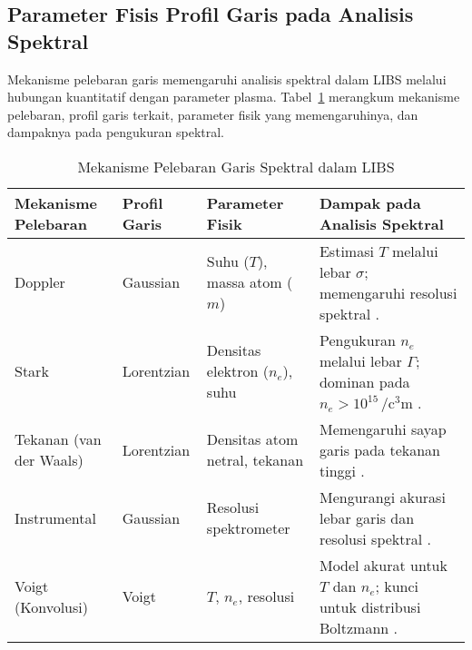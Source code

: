 \subsection{Parameter Fisis Profil Garis pada Analisis Spektral}
Mekanisme pelebaran garis memengaruhi analisis spektral dalam LIBS melalui hubungan kuantitatif dengan parameter plasma. Tabel~\ref{tab:broadening_effects} merangkum mekanisme pelebaran, profil garis terkait, parameter fisik yang memengaruhinya, dan dampaknya pada pengukuran spektral.

\begin{table}[h]
\centering
\caption{Mekanisme Pelebaran Garis Spektral dalam LIBS}
\label{tab:broadening_effects}
\begin{tabularx}{\textwidth}{XXXX}
\toprule
\textbf{Mekanisme Pelebaran} & \textbf{Profil Garis} & \textbf{Parameter Fisik} & \textbf{Dampak pada Analisis Spektral} \\
\midrule
Doppler & Gaussian & Suhu (\( T \)), massa atom (\( m \)) & Estimasi \( T \) melalui lebar \( \sigma \); memengaruhi resolusi spektral \citep{Demtroder2010}. \\
Stark & Lorentzian & Densitas elektron (\( n_e \)), suhu & Pengukuran \( n_e \) melalui lebar \( \Gamma \); dominan pada \( n_e > 10^{15} \, \si{\per\cubic\centi\meter} \) \citep{Griem1997,Konjevic1999}. \\
Tekanan (van der Waals) & Lorentzian & Densitas atom netral, tekanan & Memengaruhi sayap garis pada tekanan tinggi \citep{Konjevic1999}. \\
Instrumental & Gaussian & Resolusi spektrometer & Mengurangi akurasi lebar garis dan resolusi spektral \citep{Miziolek2006}. \\
Voigt (Konvolusi) & Voigt & \( T \), \( n_e \), resolusi & Model akurat untuk \( T \) dan \( n_e \); kunci untuk distribusi Boltzmann \citep{Aragon2008}. \\
\bottomrule
\end{tabularx}
\end{table}

